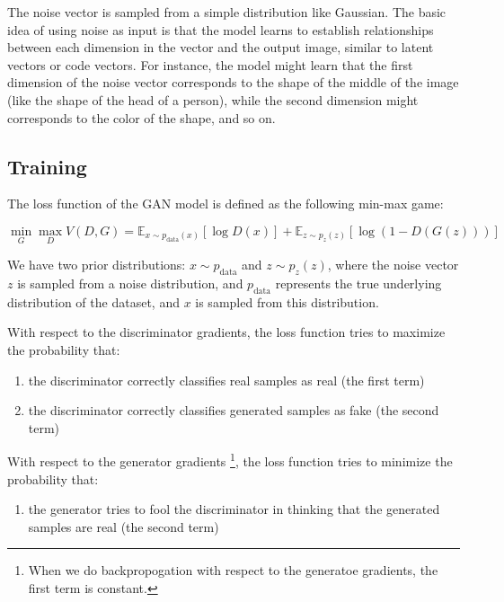 The noise vector is sampled from a simple distribution like Gaussian. The basic idea of using noise as input is that the model learns to establish relationships between each dimension in the vector and the output image, similar to latent vectors or code vectors. For instance, the model might learn that the first dimension of the noise vector corresponds to the shape of the middle of the image (like the shape of the head of a person), while the second dimension might corresponds to the color of the shape, and so on.




\subsection{Training}
\label{subsec:gan_training}

The loss function of the GAN model is defined as the following min-max game:

\begin{equation}
    \label{eq:gan_loss}
    \min_G \max_D V(D,G) = \mathbb{E}_{x \sim p_{\text{data}}(x)}[\log D(x)] + \mathbb{E}_{z \sim p_z(z)}[\log(1 - D(G(z)))]
\end{equation}

We have two prior distributions: $x \sim p_{\text{data}}$ and $z \sim p_z(z)$, where the noise vector $z$ is sampled from a noise distribution, and $p_{\text{data}}$ represents the true underlying distribution of the dataset, and $x$ is sampled from this distribution.

With respect to the discriminator gradients, the loss function tries to maximize the probability that:

\begin{enumerate}
    \item the discriminator correctly classifies real samples as real (the first term)
    \item the discriminator correctly classifies generated samples as fake (the second term)
\end{enumerate}


With respect to the generator gradients \footnote{When we do backpropogation with respect to the generatoe gradients, the first term is constant.}, the loss function tries to minimize the probability that:

\begin{enumerate}
    \item the generator tries to fool the discriminator in thinking that the generated samples are real (the second term)
\end{enumerate}


